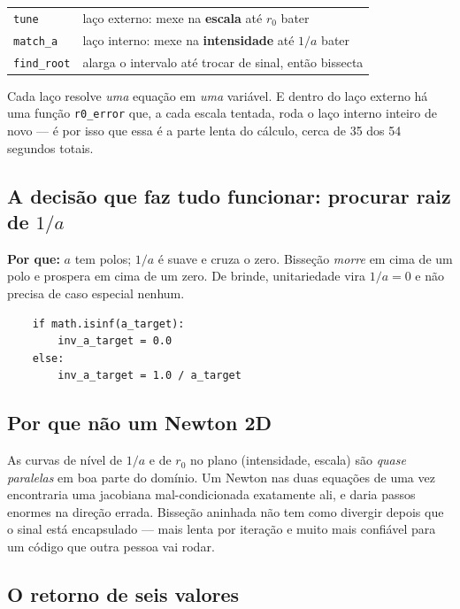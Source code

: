 \documentclass[11pt,a4paper]{article}
\newcommand{\pq}[1]{\medskip\noindent\textbf{Por que:} #1\medskip}
\begin{document}
\begin{center}
\begin{tabular}{ll}
\toprule
\texttt{tune} & laço externo: mexe na \textbf{escala} até $r_0$ bater \\
\quad\texttt{match\_a} & laço interno: mexe na \textbf{intensidade} até $1/a$ bater \\
\quad\quad\texttt{find\_root} & alarga o intervalo até trocar de sinal, então bissecta \\
\bottomrule
\end{tabular}
\end{center}

Cada laço resolve \emph{uma} equação em \emph{uma} variável. E dentro do laço
externo há uma função \texttt{r0\_error} que, a cada escala tentada, roda o laço
interno inteiro de novo --- é por isso que essa é a parte lenta do cálculo,
cerca de 35 dos 54 segundos totais.

\subsection*{A decisão que faz tudo funcionar: procurar raiz de $1/a$}

\pq{$a$ tem polos; $1/a$ é suave e cruza o zero. Bisseção \emph{morre} em cima de
um polo e prospera em cima de um zero. De brinde, unitariedade vira $1/a = 0$ e
não precisa de caso especial nenhum.}

\begin{lstlisting}
    if math.isinf(a_target):
        inv_a_target = 0.0
    else:
        inv_a_target = 1.0 / a_target
\end{lstlisting}

\subsection*{Por que não um Newton 2D}

As curvas de nível de $1/a$ e de $r_0$ no plano (intensidade, escala) são
\emph{quase paralelas} em boa parte do domínio. Um Newton nas duas equações de
uma vez encontraria uma jacobiana mal-condicionada exatamente ali, e daria passos
enormes na direção errada. Bisseção aninhada não tem como divergir depois que o
sinal está encapsulado --- mais lenta por iteração e muito mais confiável para um
código que outra pessoa vai rodar.

\subsection*{O retorno de seis valores}
\end{document}
